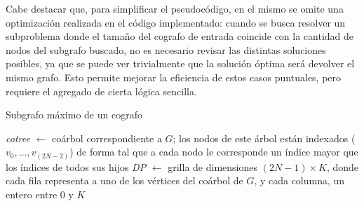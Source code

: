 Cabe destacar que, para simplificar el pseudocódigo, en el mismo se omite una
optimización realizada en el código implementado: cuando se busca resolver un
subproblema donde el tamaño del cografo de entrada coincide con la cantidad de
nodos del subgrafo buscado, no es necesario revisar las distintas soluciones
posibles, ya que se puede ver trivialmente que la solución óptima será
devolver el mismo grafo. Esto permite mejorar la eficiencia de estos casos
puntuales, pero requiere el agregado de cierta lógica sencilla.

\bigskip
\begin{algorithm}[H]
    \SetAlgoVlined
    \caption{Subgrafo máximo de un cografo}
    \label{alg:ex3:dp}

    \textit{cotree} $\gets$ coárbol correspondiente a $G$; los nodos de este árbol
    están indexados ($v_0, \dots, v_{(2N-2)}$) de forma tal que a cada nodo le
    corresponde un índice mayor que los índices de todos sus hijos \;
    \textit{DP} $\gets$ grilla de dimensiones $(2N - 1) \times K$,
    donde cada fila representa a uno de los vértices del coárbol de $G$, y
    cada columna, un entero entre $0$ y $K$ \;


\end{algorithm}
